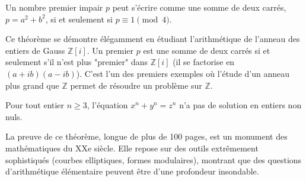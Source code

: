 \begin{theorem}
    Un nombre premier impair $p$ peut s'écrire comme une somme de deux carrés, $p = a^2+b^2$, si et seulement si $p \equiv 1 \pmod 4$.
\end{theorem}

\begin{remark}
    Ce théorème se démontre élégamment en étudiant l'arithmétique de l'anneau des entiers de Gauss $\mathbb{Z}[i]$. Un premier $p$ est une somme de deux carrés si et seulement s'il n'est plus "premier" dans $\mathbb{Z}[i]$ (il se factorise en $(a+ib)(a-ib)$). C'est l'un des premiers exemples où l'étude d'un anneau plus grand que $\mathbb{Z}$ permet de résoudre un problème sur $\mathbb{Z}$.
\end{remark}

\begin{theorem}
    Pour tout entier $n \ge 3$, l'équation $x^n+y^n=z^n$ n'a pas de solution en entiers non nuls.
\end{theorem}
\begin{remark}
    La preuve de ce théorème, longue de plus de 100 pages, est un monument des mathématiques du XXe siècle. Elle repose sur des outils extrêmement sophistiqués (courbes elliptiques, formes modulaires), montrant que des questions d'arithmétique élémentaire peuvent être d'une profondeur insondable.
\end{remark}